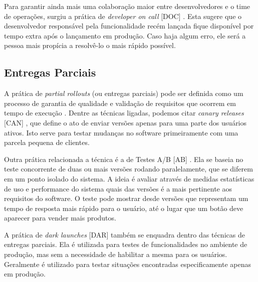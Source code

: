 Para garantir ainda mais uma colaboração maior entre desenvolvedores e o time de operações, surgiu a prática de \emph{developer on call} [DOC] \cite{devAndDeploymentFB}. Esta sugere que o desenvolvedor responsável pela funcionalidade recém lançada fique disponível por tempo extra após o lançamento em produção. Caso haja algum erro, ele será a pessoa mais propícia a resolvê-lo o mais rápido possível.

\subsection{Entregas Parciais}

A prática de \emph{partial rollouts} (ou entregas parciais) pode ser definida como um processo de garantia de qualidade e validação de requisitos que ocorrem em tempo de execução \cite{empiricalStudy2016}. Dentre as técnicas ligadas, podemos citar \emph{canary releases} [CAN] \cite{continuousDeliveryBook}, que define o ato de enviar versões apenas para uma parte dos usuários ativos. Isto serve para testar mudanças no software primeiramente com uma parcela pequena de clientes.

Outra prática relacionada a técnica é a de Testes A/B [AB] \cite{testsAB}. Ela se baseia no teste concorrente de duas ou mais versões rodando paralelamente, que se diferem em um ponto isolado do sistema. A ideia é avaliar através de medidas estatísticas de uso e performance do sistema quais das versões é a mais pertinente aos requisitos do software. O teste pode mostrar desde versões que representam um tempo de resposta mais rápido para o usuário, até o lugar que um botão deve aparecer para vender mais produtos.

A prática de \emph{dark launches} [DAR] \cite{devAndDeploymentFB} também se enquadra dentro das técnicas de entregas parciais. Ela é utilizada para testes de funcionalidades no ambiente de produção, mas sem a necessidade de habilitar a mesma para os usuários. Geralmente é utilizado para testar situações encontradas especificamente apenas em produção.  

